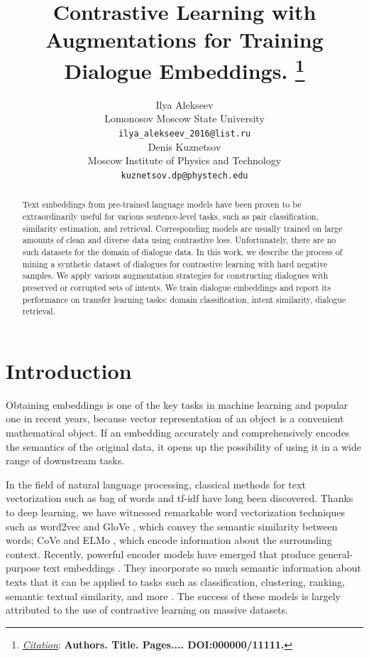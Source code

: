 \documentclass{article}
\title{Contrastive Learning with Augmentations for Training Dialogue Embeddings.
\thanks{\textit{\underline{Citation}}: 
\textbf{Authors. Title. Pages.... DOI:000000/11111.}} 
}
\author{
  Ilya Alekseev \\
  Lomonosov Moscow State University \\
  \texttt{ilya\_alekseev\_2016@list.ru} \\
   \And
  Denis Kuznetsov \\
  Moscow Institute of Physics and Technology \\
  \texttt{kuznetsov.dp@phystech.edu} \\
}
\begin{document}
\maketitle


\begin{abstract}
Text embeddings from pre-trained language models have been proven to be extraordinarily useful for various sentence-level tasks, such as pair classification, similarity estimation, and retrieval. Corresponding models are usually trained on large amounts of clean and diverse data using contrastive loss. Unfortunately, there are no such datasets for the domain of dialogue data. In this work, we describe the process of mining a synthetic dataset of dialogues for contrastive learning with hard negative samples. We apply various augmentation strategies for constructing dialogues with preserved or corrupted sets of intents. We train dialogue embeddings and report its performance on transfer learning tasks: domain classification, intent similarity, dialogue retrieval.
\end{abstract}




\section{Introduction}
Obtaining embeddings is one of the key tasks in machine learning and popular one in recent years, because vector representation of an object is a convenient mathematical object. If an embedding accurately and comprehensively encodes the semantics of the original data, it opens up the possibility of using it in a wide range of downstream tasks.

In the field of natural language processing, classical methods for text vectorization such as bag of words \cite{bow} and tf-idf \cite{SprckJones2021ASI} have long been discovered. Thanks to deep learning, we have witnessed remarkable word vectorization techniques such as word2vec \cite{mikolov2013efficient} and GloVe \cite{pennington-etal-2014-glove}, which convey the semantic similarity between words; CoVe \cite{mccann2018learned} and ELMo \cite{peters-etal-2018-deep}, which encode information about the surrounding context. Recently, powerful encoder models have emerged that produce general-purpose text embeddings \cite{xiao2023cpack, wang2022text, li2023general}. They incorporate so much semantic information about texts that it can be applied to tasks such as classification, clustering, ranking, semantic textual similarity, and more \cite{muennighoff2023mteb}. The success of these models is largely attributed to the use of contrastive learning on massive datasets. 
\end{document}
